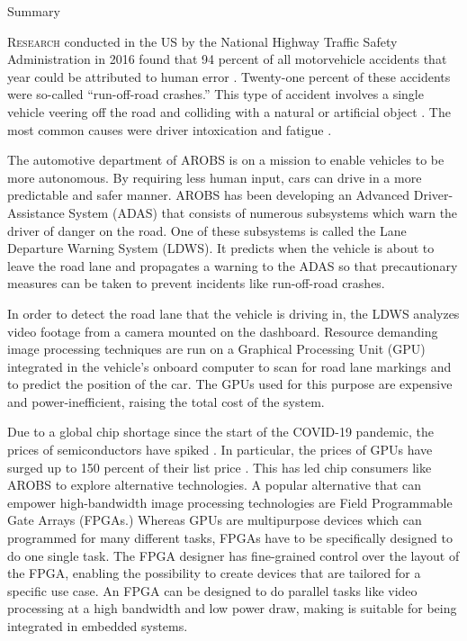\documentclass{matthijs}
\begin{document}

	\thispagestyle{empty}
	
	\setcounter{tocdepth}{2}

	\begin{hoofdstuk*}{Summary}

		\setlength\parindent{1.5em}
		\setlength{\parskip}{0.5em plus 0.2em minus 0.1em}
		\linespread{1.2}
		
		\lettrine[findent=0.3em, nindent=0.0em, lraise=0.03]{R}{esearch} conducted in the US by the National Highway Traffic Safety Administration in 2016 found that 94 percent of all motorvehicle accidents that year could be attributed to human error \cite{nhtsa2017fatal}.
		Twenty-one percent of these accidents were so-called ``run-off-road crashes.''
		This type of accident involves a single vehicle veering off the road and colliding with a natural or artificial object \cite{liu2009factors}.
		The most common causes were driver intoxication and fatigue \cite{nhtsa2017fatal}.

		The automotive department of AROBS is on a mission to enable vehicles to be more autonomous.
		By requiring less human input, cars can drive in a more predictable and safer manner.
		AROBS has been developing an Advanced Driver-Assistance System (ADAS) that consists of numerous subsystems which warn the driver of danger on the road.
		One of these subsystems is called the Lane Departure Warning System (LDWS).
		It predicts when the vehicle is about to leave the road lane and propagates a warning to the ADAS so that precautionary measures can be taken to prevent incidents like run-off-road crashes.

		In order to detect the road lane that the vehicle is driving in, the LDWS analyzes video footage from a camera mounted on the dashboard.
		Resource demanding image processing techniques are run on a Graphical Processing Unit (GPU) integrated in the vehicle's onboard computer to scan for road lane markings and to predict the position of the car.
		The GPUs used for this purpose are expensive and power-inefficient, raising the total cost of the system.

		Due to a global chip shortage since the start of the COVID-19 pandemic, the prices of semiconductors have spiked \cite{ivanova2021chip}.
		In particular, the prices of GPUs have surged up to 150 percent of their list price \cite{cheng2021chip}.
		This has led chip consumers like AROBS to explore alternative technologies.
		A popular alternative that can empower high-bandwidth image processing technologies are Field Programmable Gate Arrays (FPGAs.)
		Whereas GPUs are multipurpose devices which can programmed for many different tasks, FPGAs have to be specifically designed to do one single task.
		The FPGA designer has fine-grained control over the layout of the FPGA, enabling the possibility to create devices that are tailored for a specific use case.
		An FPGA can be designed to do parallel tasks like video processing at a high bandwidth and low power draw, making is suitable for being integrated in embedded systems.


\end{hoofdstuk*}
\end{document}
